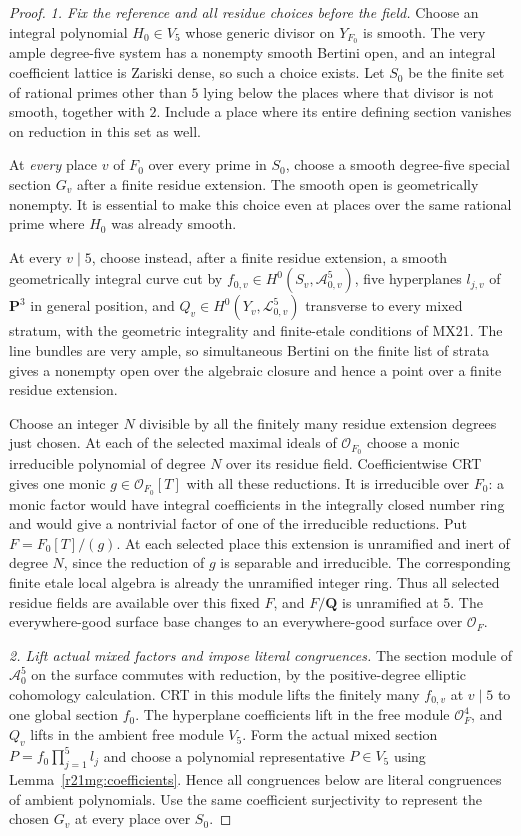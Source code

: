 \begin{proof}
\emph{1. Fix the reference and all residue choices before the field.}
Choose an integral polynomial $H_0\in V_5$ whose generic divisor
on $Y_{F_0}$ is smooth.  The very ample degree-five system has a
nonempty smooth Bertini open, and an integral coefficient lattice
is Zariski dense, so such a choice exists.
Let $S_0$ be the finite set of rational primes other than $5$ lying
below the places where that divisor is not smooth, together with
$2$.  Include a place where its entire defining section vanishes
on reduction in this set as well.

At \emph{every} place $v$ of $F_0$ over every prime in $S_0$, choose
a smooth degree-five special section $G_v$ after a finite residue
extension.  The smooth open is geometrically nonempty.  It is
essential to make this choice even at places over the same rational
prime where $H_0$ was already smooth.

At every $v\mid5$, choose instead, after a finite residue extension,
a smooth geometrically integral curve cut by
$f_{0,v}\in H^0(S_v,\mathcal A_{0,v}^5)$, five hyperplanes
$l_{j,v}$ of $\mathbf P^3$ in general position, and
$Q_v\in H^0(Y_v,\mathcal L_{0,v}^5)$ transverse to every mixed
stratum, with the geometric integrality and finite-etale conditions
of MX21.  The line bundles are very ample, so simultaneous Bertini
on the finite list of strata gives a nonempty open over the
algebraic closure and hence a point over a finite residue extension.

Choose an integer $N$ divisible by all the finitely many residue
extension degrees just chosen.  At each of the selected maximal
ideals of $\mathcal O_{F_0}$ choose a monic irreducible polynomial
of degree $N$ over its residue field.  Coefficientwise CRT gives one
monic $g\in\mathcal O_{F_0}[T]$ with all these reductions.  It is
irreducible over $F_0$: a monic factor would have integral
coefficients in the integrally closed number ring and would give
a nontrivial factor of one of the irreducible reductions.
Put $F=F_0[T]/(g)$.  At each selected place this extension is
unramified and inert of degree $N$, since the reduction of $g$
is separable and irreducible.  The corresponding finite etale local
algebra is already the unramified integer ring.  Thus all selected
residue fields are available over this fixed $F$, and $F/\mathbf Q$
is unramified at $5$.  The everywhere-good surface base changes to
an everywhere-good surface over $\mathcal O_F$.

\emph{2. Lift actual mixed factors and impose literal congruences.}
The section module of $\mathcal A_0^5$ on the surface commutes with
reduction, by the positive-degree elliptic cohomology calculation.
CRT in this module lifts the finitely many $f_{0,v}$ at $v\mid5$
to one global section $f_0$.  The hyperplane coefficients lift in
the free module $\mathcal O_F^4$, and $Q_v$ lifts in the ambient
free module $V_5$.  Form the actual mixed section
$P=f_0\prod_{j=1}^5l_j$ and choose a polynomial representative
$P\in V_5$ using Lemma~\ref{r21mg:coefficients}.  Hence all
congruences below are literal congruences of ambient polynomials.
Use the same coefficient surjectivity to represent the chosen
$G_v$ at every place over $S_0$.


\end{proof}
